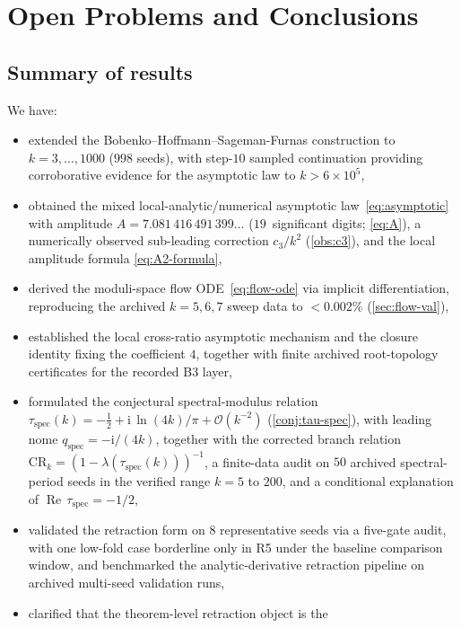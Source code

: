 \documentclass[11pt,a4paper]{article}
\theoremstyle{plain}
\theoremstyle{definition}
\theoremstyle{remark}
\DeclareMathOperator{\Real}{Re}
\newcommand{\ii}{\mathrm{i}}
\newcommand{\Oo}{\mathcal{O}}
\begin{document}
\section{Open Problems and Conclusions}\label{sec:open}

\subsection{Summary of results}
We have:
\begin{itemize}[nosep]
\item extended the Bobenko--Hoffmann--Sageman-Furnas construction to
  $k = 3,\ldots,1000$ ($998$ seeds), with step-$10$ sampled
  continuation providing corroborative evidence for the asymptotic law
  to $k > 6\times 10^5$,
\item obtained the mixed local-analytic/numerical asymptotic
  law~\eqref{eq:asymptotic} with amplitude
  $A = 7.081\,416\,491\,399\ldots$ ($19$~significant digits;
  \eqref{eq:A}), a numerically observed sub-leading correction
  $c_3/k^2$ (\cref{obs:c3}), and the local amplitude formula
  \eqref{eq:A2-formula},
\item derived the moduli-space flow ODE~\eqref{eq:flow-ode} via
  implicit differentiation, reproducing the archived $k=5,6,7$ sweep data to
  $< 0.002\%$ (\cref{sec:flow-val}),
\item established the local cross-ratio asymptotic mechanism and the
  closure identity fixing the coefficient $4$, together with finite
  archived root-topology certificates for the recorded B3 layer,
\item formulated the conjectural spectral-modulus relation
  $\tau_{\mathrm{spec}}(k) = -\tfrac12 + \ii\,\ln(4k)/\pi + \Oo(k^{-2})$
  (\cref{conj:tau-spec}), with leading nome
  $q_{\mathrm{spec}} = -\ii/(4k)$, together with the corrected branch
  relation $\mathrm{CR}_k=(1-\lambda(\tau_{\mathrm{spec}}(k)))^{-1}$,
  a finite-data audit on $50$ archived spectral-period seeds in the
  verified range $k=5$ to $200$, and a conditional explanation of
  $\Real\,\tau_{\mathrm{spec}}=-1/2$,
\item validated the retraction form on $8$ representative seeds via a
  five-gate audit, with one low-fold case borderline only in R5 under the
  baseline comparison window, and benchmarked the analytic-derivative retraction pipeline
  on archived multi-seed validation runs,
\item clarified that the theorem-level retraction object is the

\end{itemize}
\end{document}
